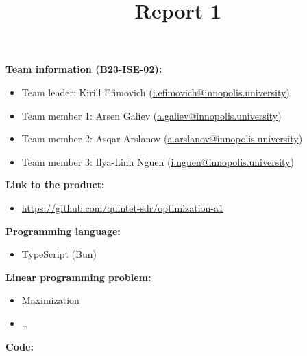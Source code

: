 \documentclass{article}
\title{\textbf{Report 1}}
\author{}
\date{}
\begin{document}
\maketitle

\thispagestyle{fancy}

\textbf{Team information (B23-ISE-02):}
\begin{itemize}[label=-]
    \item Team leader: Kirill Efimovich (\href{mailto:k.efimovich@innopolis.university}{i.efimovich@innopolis.university})
    \item Team member 1: Arsen Galiev (\href{mailto:a.galiev@innopolis.university}{a.galiev@innopolis.university})
    \item Team member 2: Asqar Arslanov (\href{mailto:a.arslanov@innopolis.university}{a.arslanov@innopolis.university})
    \item Team member 3: Ilya-Linh Nguen (\href{mailto:i.nguen@innopolis.university}{i.nguen@innopolis.university})
\end{itemize}

\textbf{Link to the product:}
\begin{itemize}[label=-]
    \item \url{https://github.com/quintet-sdr/optimization-a1}
\end{itemize}

\textbf{Programming language:}
\begin{itemize}[label=-]
    \item TypeScript (Bun)
\end{itemize}

\textbf{Linear programming problem:}
\begin{itemize}[label=-]
    \item Maximization
    \item \dots
\end{itemize}

\newpage

\textbf{Code:}


\newpage


\newpage

\end{document}
